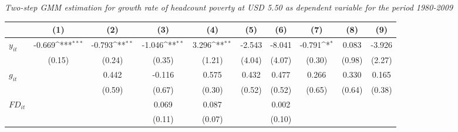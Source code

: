 \documentclass[12pt, a4paper]{article}
\begin{document}
\begin{table}
\begin{threeparttable}
\begin{tablenotes}
		\end{tablenotes}
	\end{threeparttable}
	\caption[Two-Step System-GMM Estimation Results for Headcount Poverty at USD 5.50 for 1980-2009]{\textit{Two-step GMM estimation for growth rate of headcount poverty at USD 5.50 as dependent variable for the period 1980-2009}}
	\label{2GMM5502010}
\end{table}

	\begin{table}
	\centering
	\scriptsize
	\setlength\tabcolsep{1pt}	
	\begin{threeparttable}
		{
			\def\sym#1{\ifmmode^{#1}\else\(^{#1}\)\fi}
			\begin{tabular}{l*{9}{c}}
				\hline\hline
				&\multicolumn{1}{c}{(1)}&\multicolumn{1}{c}{(2)}&\multicolumn{1}{c}{(3)}&\multicolumn{1}{c}{(4)}&\multicolumn{1}{c}{(5)}&\multicolumn{1}{c}{(6)}&\multicolumn{1}{c}{(7)}&\multicolumn{1}{c}{(8)}&\multicolumn{1}{c}{(9)}\\
				\hline
				$y_{it}$               &      -0.669\sym{***}&      -0.793\sym{**} &      -1.046\sym{**} &       3.296\sym{**} &      -2.543         &      -8.041         &      -0.791\sym{*}  &       0.083         &      -3.926         \\
				&      (0.15)         &      (0.24)         &      (0.35)         &      (1.21)         &      (4.04)         &      (4.07)         &      (0.30)         &      (0.98)         &      (2.27)         \\
				$g_{it}$             &                     &       0.442         &      -0.116         &       0.575         &       0.432         &       0.477         &       0.266         &       0.330         &       0.165         \\
				&                     &      (0.59)         &      (0.67)         &      (0.30)         &      (0.52)         &      (0.52)         &      (0.65)         &      (0.64)         &      (0.38)         \\
				$FD_{it}$               &                     &                     &       0.069         &       0.087         &                     &       0.002         &                     &                     &                     \\
				&                     &                     &      (0.11)         &      (0.07)         &                     &      (0.10)         &                     &                     &                     \\

\end{tabular}}
\end{threeparttable}
\end{table}
\end{document}
